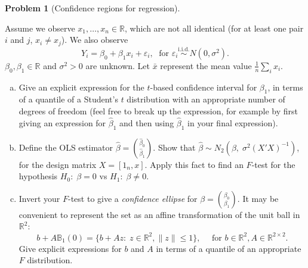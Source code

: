 \documentclass{article}
\newcommand{\RR}{\mathbb{R}}
\newcommand{\simiid}{\overset{\text{i.i.d.}}{\sim}}
\newcommand{\ep}{\varepsilon}
\theoremstyle{definition}
\newtheorem{problem}{Problem}
\begin{document}
\begin{problem}[Confidence regions for regression]
\label{prob:conf-reg-regression}

Assume we observe $x_1,\ldots,x_n \in \RR$, which are not all identical (for at least one pair $i$ and $j$, $x_i\neq x_j$). We also observe
\[
Y_i = \beta_0 + \beta_1 x_i + \ep_i, \; \text{ for } \ep_i \simiid N(0,\sigma^2).
\]
$\beta_0,\beta_1\in \RR$ and $\sigma^2 > 0$ are unknown. Let $\bar{x}$ represent the mean value $\frac{1}{n}\sum_i x_i$.

\begin{enumerate}[(a)]
\item Give an explicit expression for the $t$-based confidence interval for $\beta_1$, in terms of a quantile of a Student's $t$ distribution with an appropriate number of degrees of freedom (feel free to break up the expression, for example by first giving an expression for $\hat\beta_1$ and then using $\hat\beta_1$ in your final expression).




\item Define the OLS estimator $\hat\beta = \binom{\hat\beta_0}{\hat\beta_1}$. Show that $\hat\beta \sim N_2\left(\beta, \; \sigma^2(X'X)^{-1}\right)$, for the design matrix $X = [1_n, x]$. Apply this fact to find an $F$-test for the hypothesis $H_0:\;\beta=0$ vs $H_1:\;\beta \neq 0$.

\item Invert your $F$-test to give a {\em confidence ellipse} for $\beta = \binom{\beta_0}{\beta_1}$.  It may be convenient to represent the set as an affine transformation of the unit ball in $\RR^2$:
\[
b + A \mathbb{B}_1(0) = \{b + Az:\; z\in \RR^2, \|z\| \leq 1\}, \quad \text{ for } b \in \RR^2, A \in \RR^{2\times 2}.
\]
Give explicit expressions for $b$ and $A$ in terms of a quantile of an appropriate $F$ distribution.





\end{enumerate}
\end{problem}
\end{document}
